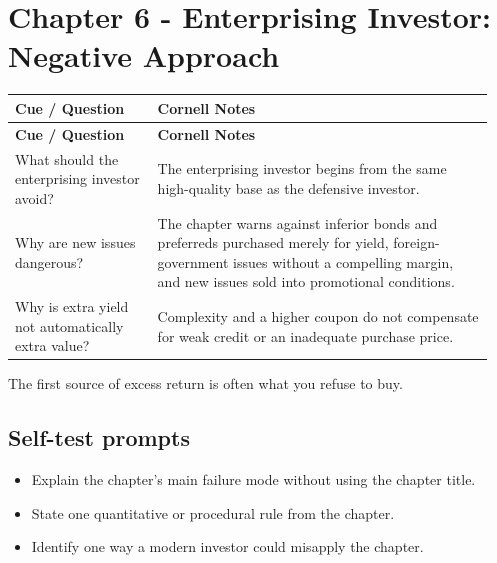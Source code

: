 \documentclass[11pt]{article}
\begin{document}
\section{Chapter 6 - Enterprising Investor: Negative Approach}
\begin{longtable}{@{}>{\raggedright\arraybackslash}p{0.29\linewidth}>{\raggedright\arraybackslash}p{0.66\linewidth}@{}}\toprule\textbf{Cue / Question} & \textbf{Cornell Notes}\\\midrule\endfirsthead\toprule\textbf{Cue / Question} & \textbf{Cornell Notes}\\\midrule\endhead
What should the enterprising investor avoid? & The enterprising investor begins from the same high-quality base as the defensive investor. \\
Why are new issues dangerous? & The chapter warns against inferior bonds and preferreds purchased merely for yield, foreign-government issues without a compelling margin, and new issues sold into promotional conditions. \\
Why is extra yield not automatically extra value? & Complexity and a higher coupon do not compensate for weak credit or an inadequate purchase price. \\
\bottomrule\end{longtable}
\begin{principlebox}The first source of excess return is often what you refuse to buy.\end{principlebox}
\subsection*{Self-test prompts}\begin{itemize}\item Explain the chapter's main failure mode without using the chapter title.\item State one quantitative or procedural rule from the chapter.\item Identify one way a modern investor could misapply the chapter.\end{itemize}
\end{document}
